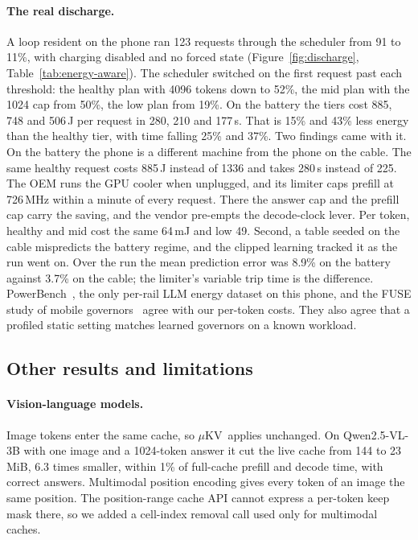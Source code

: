\documentclass[sigconf, anonymous=false, screen=true]{acmart}
\newcommand{\muKV}{$\mu$KV}
\begin{document}
\paragraph{The real discharge.} A loop resident on the phone ran 123 requests through the scheduler from 91 to 11\%, with charging disabled and no forced state (Figure~\ref{fig:discharge}, Table~\ref{tab:energy-aware}). The scheduler switched on the first request past each threshold: the healthy plan with 4096 tokens down to 52\%, the mid plan with the 1024 cap from 50\%, the low plan from 19\%. On the battery the tiers cost 885, 748 and 506\,J per request in 280, 210 and 177\,s. That is 15\% and 43\% less energy than the healthy tier, with time falling 25\% and 37\%. Two findings came with it. On the battery the phone is a different machine from the phone on the cable. The same healthy request costs 885\,J instead of 1336 and takes 280\,s instead of 225. The OEM runs the GPU cooler when unplugged, and its limiter caps prefill at 726\,MHz within a minute of every request. There the answer cap and the prefill cap carry the saving, and the vendor pre-empts the decode-clock lever. Per token, healthy and mid cost the same 64\,mJ and low 49. Second, a table seeded on the cable mispredicts the battery regime, and the clipped learning tracked it as the run went on. Over the run the mean prediction error was 8.9\% on the battery against 3.7\% on the cable; the limiter's variable trip time is the difference. PowerBench~\cite{cai2026powerbench}, the only per-rail LLM energy dataset on this phone, and the FUSE study of mobile governors~\cite{zhang2025fusellm} agree with our per-token costs. They also agree that a profiled static setting matches learned governors on a known workload.

\subsection{Other results and limitations}
\label{sec:limitations}

\paragraph{Vision-language models.} Image tokens enter the same cache, so \muKV\ applies unchanged. On Qwen2.5-VL-3B with one image and a 1024-token answer it cut the live cache from 144 to 23\,MiB, 6.3 times smaller, within 1\% of full-cache prefill and decode time, with correct answers. Multimodal position encoding gives every token of an image the same position. The position-range cache API cannot express a per-token keep mask there, so we added a cell-index removal call used only for multimodal caches.
\end{document}
